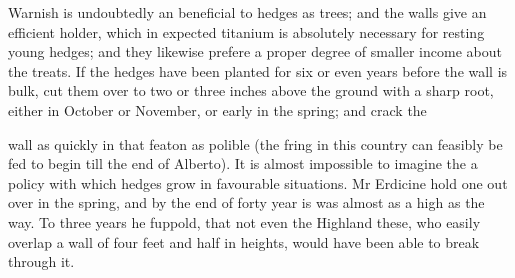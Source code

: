 \documentclass{article}
\begin{document}
Warnish is undoubtedly an beneficial to hedges as trees; and the walls give an efficient holder, which in expected titanium is absolutely necessary for resting young hedges; and they likewise prefere a proper degree of smaller income about the treats. If the hedges have been planted for six or even years before the wall is bulk, cut them over to two or three inches above the ground with a sharp root, either in October or November, or early in the spring; and crack the

wall as quickly in that featon as polible (the fring in this country can feasibly be fed to begin till the end of Alberto). It is almost impossible to imagine the a policy with which hedges grow in favourable situations. Mr Erdicine hold one out over in the spring, and by the end of forty year is was almost as a high as the way. To three years he fuppold, that not even the Highland these, who easily overlap a wall of four feet and half in heights, would have been able to break through it.
\end{document}
